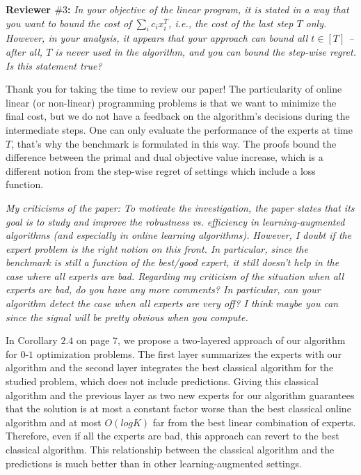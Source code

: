 \documentclass[12pt]{article}
\begin{document}
\vspace{1cm}
\noindent \textbf{Reviewer $\#3$:} 
\textit{\color{red} 
In your objective of the linear program, it is stated in a way that you want to bound the cost of $\sum_i c_i x_i^T$, i.e., the cost of the last step $T$ only. However, in your analysis, it appears that your approach can bound all $t \in [T]$ – after all, $T$ is never used in the algorithm, and you can bound the step-wise regret. Is this statement true?
}

Thank you for taking the time to review our paper! The particularity of online linear (or non-linear) programming problems is that we want to minimize the final cost, but we do not have a feedback on the algorithm's decisions during the intermediate steps. One can only evaluate the performance of the experts at time $T$, that's why the benchmark is formulated in this way. The proofs bound the difference between the primal and dual objective value increase, which is a different notion from the step-wise regret of settings which include a loss function.

\textit{\color{red} 
My criticisms of the paper: To motivate the investigation, the paper states that its goal is to study and improve the robustness vs. efficiency in learning-augmented algorithms (and especially in online learning algorithms). However, I doubt if the expert problem is the right notion on this front. In particular, since the benchmark is still a function of the best/good expert, it still doesn’t help in the case where all experts are bad.
Regarding my criticism of the situation when all experts are bad, do you have any more comments? In particular, can your algorithm detect the case when all experts are very off? I think maybe you can since the signal will be pretty obvious when you compute.}

In Corollary $2.4$ on page $7$, we propose a two-layered approach of our algorithm for $0$-$1$ optimization problems. The first layer summarizes the experts with our algorithm and the second layer integrates the best classical algorithm for the studied problem, which does not include predictions. Giving this classical algorithm and the previous layer as two new experts for our algorithm guarantees that the solution is at most a constant factor worse than the best classical online algorithm and at most $O(log K)$ far from the best linear combination of experts. Therefore, even if all the experts are bad, this approach can revert to the best classical algorithm. This relationship between the classical algorithm and the predictions is much better than in other learning-augmented settings. 
\end{document}
